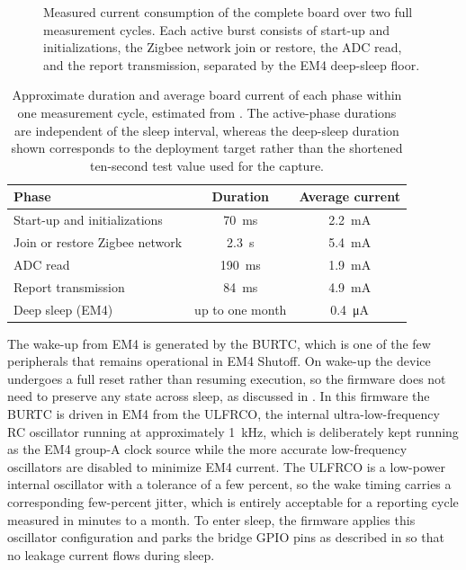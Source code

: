 \begin{figure}
    \centering
    
    \caption{Measured current consumption of the complete board over two full measurement cycles. Each active burst consists of start-up and initializations, the Zigbee network join or restore, the ADC read, and the report transmission, separated by the EM4 deep-sleep floor.}
    \label{fig:Current_2_cycles}
\end{figure}

\begin{table}
\centering
\caption{Approximate duration and average board current of each phase within one measurement cycle, estimated from . The active-phase durations are independent of the sleep interval, whereas the deep-sleep duration shown corresponds to the deployment target rather than the shortened ten-second test value used for the capture.}
\label{tab:cycle_current}
\begin{tabular}{lcc}
\hline
Phase & Duration & Average current \\
\hline
Start-up and initializations & \SI{70}{\milli\second} & \SI{2.2}{\milli\ampere} \\
Join or restore Zigbee network & \SI{2.3}{\second} & \SI{5.4}{\milli\ampere} \\
ADC read & \SI{190}{\milli\second} & \SI{1.9}{\milli\ampere} \\
Report transmission & \SI{84}{\milli\second} & \SI{4.9}{\milli\ampere} \\
Deep sleep (EM4) & up to one month & \SI{0.4}{\micro\ampere} \\
\hline
\end{tabular}
\end{table}

The wake-up from EM4 is generated by the BURTC, which is one of the few peripherals that remains operational in EM4 Shutoff.
On wake-up the device undergoes a full reset rather than resuming execution, so the firmware does not need to preserve any state across sleep, as discussed in .
In this firmware the BURTC is driven in EM4 from the ULFRCO, the internal ultra-low-frequency RC oscillator running at approximately \SI{1}{\kilo\hertz}, which is deliberately kept running as the EM4 group-A clock source while the more accurate low-frequency oscillators are disabled to minimize EM4 current.
The ULFRCO is a low-power internal oscillator with a tolerance of a few percent, so the wake timing carries a corresponding few-percent jitter, which is entirely acceptable for a reporting cycle measured in minutes to a month.
To enter sleep, the firmware applies this oscillator configuration and parks the bridge GPIO pins as described in  so that no leakage current flows during sleep.

